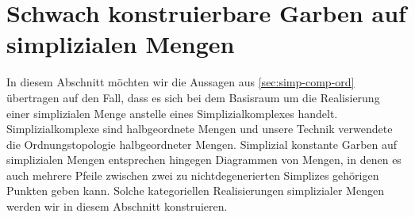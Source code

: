 
\section{Schwach konstruierbare Garben auf simplizialen Mengen}
\label{sec:simp-set-sk}

In diesem Abschnitt möchten wir die Aussagen aus
\autoref{sec:simp-comp-ord} übertragen auf den Fall, dass es sich bei
dem Basisraum um die Realisierung einer simplizialen Menge anstelle
eines Simplizialkomplexes handelt. Simplizialkomplexe sind
halbgeordnete Mengen und unsere Technik verwendete die
Ordnungstopologie halbgeordneter Mengen. Simplizial konstante Garben
auf simplizialen Mengen entsprechen hingegen Diagrammen von Mengen, in
denen es auch mehrere Pfeile zwischen zwei zu nichtdegenerierten
Simplizes gehörigen Punkten geben kann. Solche kategoriellen
Realisierungen simplizialer Mengen werden wir in diesem Abschnitt
konstruieren.

